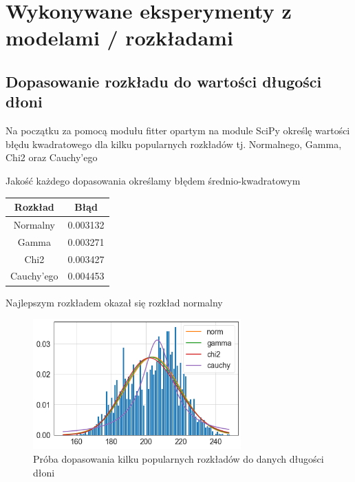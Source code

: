 \documentclass{article}
\begin{document}
\newpage
\section{Wykonywane eksperymenty z modelami / rozkładami}
\subsection{Dopasowanie rozkładu do wartości długości dłoni}
Na początku za pomocą modułu fitter opartym na module SciPy określę wartości błędu kwadratowego dla kilku popularnych rozkładów tj. Normalnego, Gamma, Chi2 oraz Cauchy’ego

Jakość każdego dopasowania określamy błędem średnio-kwadratowym
\begin{center}
\begin{tabular}{ |c|c| } 
 \hline
 Rozkład & Błąd \\ 
 \hline
 \hline
 Normalny & 0.003132 \\ 
 \hline
 Gamma & 0.003271 \\
 \hline
 Chi2 & 0.003427 \\
 \hline
 Cauchy’ego & 0.004453 \\ 
 \hline
\end{tabular}
\end{center}
Najlepszym rozkładem okazał się rozkład normalny
\begin{figure}[H]
    \centering
    \includegraphics[width=8cm]{rozklady.png}
    \caption{Próba dopasowania kilku popularnych rozkładów do danych długości dłoni}
    \label{fig:my_img}
\end{figure}





\newpage
\end{document}
